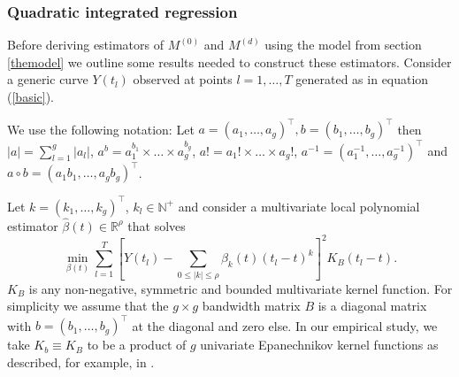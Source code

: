\subsubsection{Quadratic integrated regression }
\label{intest}
Before deriving estimators of $M^{(0)}$ and $M^{(d)}$ using the model from section \ref{themodel} we outline some results needed to construct these estimators. Consider a generic curve $Y(t_l)$ observed at points $l=1,\dots,T$ generated as in equation (\ref{basic}). 

We use the following notation: Let $a=(a_1,\dots, a_g)^{\top}, b=(b_1,\dots, b_g)^{\top}$ then $|a|=\sum_{l=1}^g |a_l|$, $a^b=a_1^{b_1} \times \dots \times a_g^{b_g}$, $a!=a_1! \times \dots \times a_g!$, $a^{-1}=(a_1^{-1},\dots, a_g^{-1})^{\top}$ and $a \circ b=(a_1  b_1,\dots,a_g b_g)^{\top}$.



Let $k=(k_1,\dots, k_g)^{\top}$, $k_l \in \mathbb{N}^{+}$ and consider a multivariate local polynomial estimator $\hat{\beta}(t) \in \mathbb{R}^\rho$ that solves
\begin{equation}\label{polymul}
\underset{\beta(t)}{\operatorname{min}} \sum_{l=1}^{T} \left[ Y(t_{l}) - \sum_{0 \leq |k| \leq \rho} \beta_{k}(t) (t_{l}-t)^k \right]^2 K_{B} (t_{l}-t).
\end{equation}
$K_B$ is any non-negative, symmetric and bounded  multivariate kernel function. For simplicity we assume that the $g \times g$ bandwidth matrix $B$ is  a diagonal matrix with $b=(b_1,\dots,b_g)^{\top}$ at the diagonal  and zero else.%
In our empirical study, we take $K_b \equiv K_B$ to be a product of $g$ univariate Epanechnikov kernel functions as described, for example, in \cite{Haerdle00}. 

